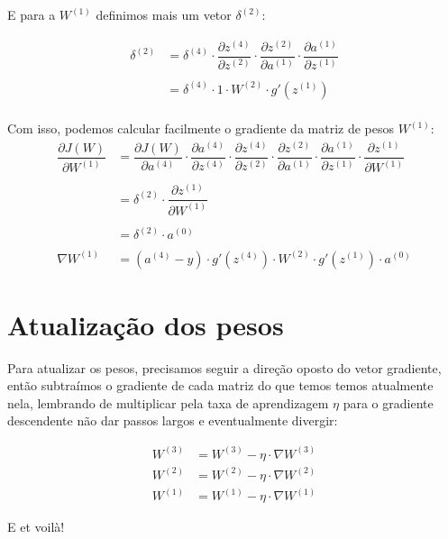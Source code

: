 \documentclass[10pt, a4paper]{article}
\begin{document}
E para a $W^{(1)}$ definimos mais um vetor $\delta^{(2)}$:

\begin{align*} \nonumber
\delta^{(2)} &= \delta^{(4)} \cdot \dfrac{\partial z^{(4)}}{\partial z^{(2)}} \cdot \dfrac{\partial z^{(2)}}{\partial a^{(1)}} \cdot \dfrac{\partial a^{(1)}}{\partial z^{(1)}} \\\\
\ &= \delta^{(4)} \cdot 1 \cdot W^{(2)} \cdot g'(z^{(1)})
\end{align*}
\\
Com isso, podemos calcular facilmente o gradiente da matriz de pesos $W^{(1)}$: \\
\begin{align*} \nonumber
\dfrac{\partial J(W)}{\partial W^{(1)}} &= \dfrac{\partial J(W)}{\partial a^{(4)}} \cdot \dfrac{\partial a^{(4)}}{\partial z^{(4)}} \cdot \dfrac{\partial z^{(4)}}{\partial z^{(2)}} \cdot \dfrac{\partial z^{(2)}}{\partial a^{(1)}} \cdot \dfrac{\partial a^{(1)}}{\partial z^{(1)}} \cdot \dfrac{\partial z^{(1)}}{\partial W^{(1)}} \\\\
\ &= \delta^{(2)} \cdot \dfrac{\partial z^{(1)}}{\partial W^{(1)}} \\\\
\ &= \delta^{(2)} \cdot  a^{(0)} \\\\
\nabla W^{(1)} &= (a^{(4)} - y) \cdot g'(z^{(4)}) \cdot W^{(2)} \cdot g'(z^{(1)}) \cdot a^{(0)}
\end{align*}

\section{Atualização dos pesos}
Para atualizar os pesos, precisamos seguir a direção oposto do vetor gradiente, então subtraímos o gradiente de cada matriz  do que temos temos atualmente nela, lembrando de multiplicar pela taxa de aprendizagem $\eta$ para o gradiente descendente não dar passos largos e eventualmente divergir:

\begin{align*} \nonumber
W^{(3)} &= W^{(3)} - \eta \cdot \nabla W^{(3)} \\
W^{(2)} &= W^{(2)} - \eta \cdot \nabla W^{(2)} \\
W^{(1)} &= W^{(1)} - \eta \cdot \nabla W^{(1)}
\end{align*}

E et voilà!
\end{document}

